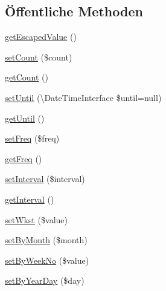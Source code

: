 \subsection*{Öffentliche Methoden}
\begin{DoxyCompactItemize}
\item 
\mbox{\hyperlink{class_eluceo_1_1i_cal_1_1_property_1_1_event_1_1_recurrence_rule_aeefc9e0958f7fbd8fc54d622c6fec793}{get\+Escaped\+Value}} ()
\item 
\mbox{\hyperlink{class_eluceo_1_1i_cal_1_1_property_1_1_event_1_1_recurrence_rule_aac239d51ccec2021d01fc408ea33cbf7}{set\+Count}} (\$count)
\item 
\mbox{\hyperlink{class_eluceo_1_1i_cal_1_1_property_1_1_event_1_1_recurrence_rule_ab8421d5cfd85c4e340cc3964dbb9c1b6}{get\+Count}} ()
\item 
\mbox{\hyperlink{class_eluceo_1_1i_cal_1_1_property_1_1_event_1_1_recurrence_rule_a4734805877b1b97c7fd0be51e76652f5}{set\+Until}} (\textbackslash{}Date\+Time\+Interface \$until=null)
\item 
\mbox{\hyperlink{class_eluceo_1_1i_cal_1_1_property_1_1_event_1_1_recurrence_rule_a0f3229985d8494d4771a3f5576a42c1e}{get\+Until}} ()
\item 
\mbox{\hyperlink{class_eluceo_1_1i_cal_1_1_property_1_1_event_1_1_recurrence_rule_a503cc739b8f888d3d82891981ae10c97}{set\+Freq}} (\$freq)
\item 
\mbox{\hyperlink{class_eluceo_1_1i_cal_1_1_property_1_1_event_1_1_recurrence_rule_ac484c1c9e796e58d8226294d0ece2553}{get\+Freq}} ()
\item 
\mbox{\hyperlink{class_eluceo_1_1i_cal_1_1_property_1_1_event_1_1_recurrence_rule_ac6b278d4cf770de7f9086d4567a5e098}{set\+Interval}} (\$interval)
\item 
\mbox{\hyperlink{class_eluceo_1_1i_cal_1_1_property_1_1_event_1_1_recurrence_rule_ab0c09ee9df8688ca165fcd065cf07687}{get\+Interval}} ()
\item 
\mbox{\hyperlink{class_eluceo_1_1i_cal_1_1_property_1_1_event_1_1_recurrence_rule_a135a880639390f1f0f7f7c82deef1fd7}{set\+Wkst}} (\$value)
\item 
\mbox{\hyperlink{class_eluceo_1_1i_cal_1_1_property_1_1_event_1_1_recurrence_rule_aa31c68d9cfd6355a0d8b2173ff2dedb5}{set\+By\+Month}} (\$month)
\item 
\mbox{\hyperlink{class_eluceo_1_1i_cal_1_1_property_1_1_event_1_1_recurrence_rule_a94c0f6b5f543a395e5edb45d2acf77c5}{set\+By\+Week\+No}} (\$value)
\item 
\mbox{\hyperlink{class_eluceo_1_1i_cal_1_1_property_1_1_event_1_1_recurrence_rule_a7e1f459a0be3139aa57b17e3f46d20dc}{set\+By\+Year\+Day}} (\$day)

\end{DoxyCompactItemize}
